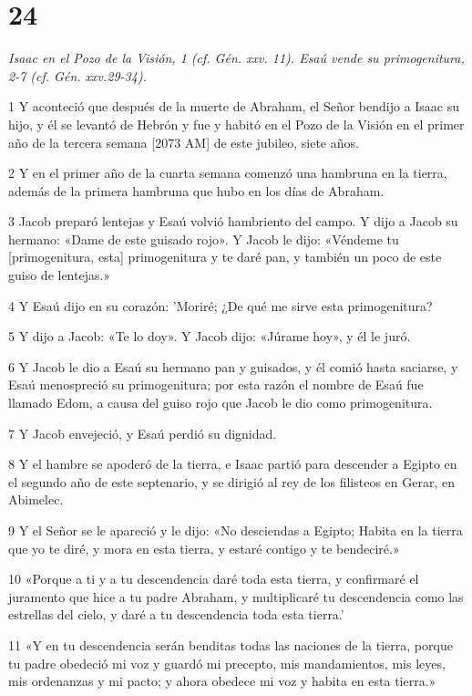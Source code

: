 \chapter{24}

\par \textit{Isaac en el Pozo de la Visión, 1 (cf. Gén. xxv. 11). Esaú vende su primogenitura, 2-7 (cf. Gén. xxv.29-34).}

\par 1 Y aconteció que después de la muerte de Abraham, el Señor bendijo a Isaac su hijo, y él se levantó de Hebrón y fue y habitó en el Pozo de la Visión en el primer año de la tercera semana [2073 AM] de este jubileo, siete años.
\par 2 Y en el primer año de la cuarta semana comenzó una hambruna en la tierra, además de la primera hambruna que hubo en los días de Abraham.
\par 3 Jacob preparó lentejas y Esaú volvió hambriento del campo. Y dijo a Jacob su hermano: «Dame de este guisado rojo». Y Jacob le dijo: «Véndeme tu [primogenitura, esta] primogenitura y te daré pan, y también un poco de este guiso de lentejas.»
\par 4 Y Esaú dijo en su corazón: 'Moriré; ¿De qué me sirve esta primogenitura?
\par 5 Y dijo a Jacob: «Te lo doy». Y Jacob dijo: «Júrame hoy», y él le juró.
\par 6 Y Jacob le dio a Esaú su hermano pan y guisados, y él comió hasta saciarse, y Esaú menospreció su primogenitura; por esta razón el nombre de Esaú fue llamado Edom, a causa del guiso rojo que Jacob le dio como primogenitura.
\par 7 Y Jacob envejeció, y Esaú perdió su dignidad.
\par 8 Y el hambre se apoderó de la tierra, e Isaac partió para descender a Egipto en el segundo año de este septenario, y se dirigió al rey de los filisteos en Gerar, en Abimelec.
\par 9 Y el Señor se le apareció y le dijo: «No desciendas a Egipto; Habita en la tierra que yo te diré, y mora en esta tierra, y estaré contigo y te bendeciré.»
\par 10 «Porque a ti y a tu descendencia daré toda esta tierra, y confirmaré el juramento que hice a tu padre Abraham, y multiplicaré tu descendencia como las estrellas del cielo, y daré a tu descendencia toda esta tierra.'
\par 11 «Y en tu descendencia serán benditas todas las naciones de la tierra, porque tu padre obedeció mi voz y guardó mi precepto, mis mandamientos, mis leyes, mis ordenanzas y mi pacto; y ahora obedece mi voz y habita en esta tierra.»
